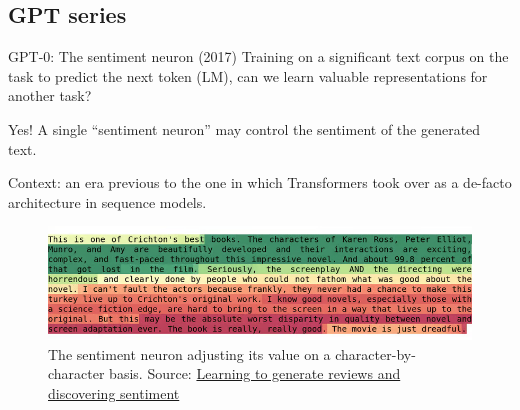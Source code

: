 \documentclass[9pt]{beamer}
\begin{document}
\subsection{GPT series}
\begin{frame}{GPT-0: The sentiment neuron (2017)}  
   Training on a significant text corpus on the task to predict the next token (LM), can we learn valuable representations for another task?

   Yes! A single ``sentiment neuron'' may control the sentiment of the generated text.
   
   Context: an era previous to the one in which Transformers took over as a de-facto architecture in sequence models.
    \begin{figure}
        \centering
        \includegraphics[width=\textwidth]{img/gpt0-sentiment-neuron.png}
        \caption{The sentiment neuron adjusting its value on a character-by-character basis. Source: \href{https://openai.com/research/unsupervised-sentiment-neuron}{Learning to generate reviews and
discovering sentiment}}
        \label{fig:enter-label}
    \end{figure}
\end{frame}
\end{document}
